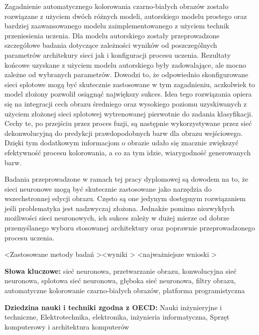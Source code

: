   Zagadnienie automatycznego kolorowania czarno-białych
  obrazów zostało rozwiązane z użyciem dwóch różnych modeli, autorskiego modelu
  prostego oraz bardziej zaawansowanego modelu zaimplementowanego z użyciem technik
  przeniesienia uczenia. Dla modelu autorskiego zostały przeprowadzone szczegółowe
  badania dotyczące zależności wyników od poszczególnych parametrów architekury
  sieci jak i konfiguracji procesu uczenia. Rezultaty końcowe uzyskane z użyciem
  modelu autorskiego były zadowalające, ale mocno zależne od wybranych parametrów.
  Dowodzi to, że odpowiednio skonfigurowane sieci splotowe mogą być skutecznie
  zastosowane w tym zagadnieniu, aczkolwiek to model złożony pozwolił osiągnąć
  największy sukces.
  Idea tego rozwiązania opiera się na integracji cech obrazu średniego oraz wysokiego
  poziomu uzyskiwanych z użyciem złożonej sieci splotowej wytrenowanej pierwotnie do
  zadania klasyfikacji. Cechy te, po przejściu przez proces fuzji, są następnie
  wykorzystywane przez sieć dekonwolucyjną do predykcji prawdopodobnych barw dla
  obrazu wejściowego. Dzięki tym dodatkowym informacjom o obrazie udało się
  znacznie zwiększyć efektywność procesu kolorowania, a co za tym idzie,
  wiarygodność generowanych barw.

  Badania przeprowadzone w ramach tej pracy dyplomowej są dowodem na to, że
  sieci neuronowe mogą być skutecznie zastosowane jako narzędzia do wszechstronnej
  edycji obrazu. Często są one jedynym dostępnym rozwiązaniem jeśli problematyka
  jest nadzwyczaj złożona. Jednakże pomimo niezwykłych możliwości sieci
  neuronowych, ich sukces zależy w dużej mierze od dobrze przemyślanego
  wyboru stosowanej architektury oraz poprawnie przeprowadzonego
  procesu uczenia.

  \textless Zastosowane metody badań \textgreater \textless wyniki \textgreater
  \textless najważniejsze wnioski \textgreater

  \bigskip

  \noindent\textbf{Słowa kluczowe:} sieć neuronowa, przetwarzanie obrazu,
  konwolucyjna sieć neuronowa, splotowa sieć neuronowa,
  głęboka sieć neuronowa, filtry obrazu, automatyczne kolorowanie czarno-białych
  obrazów, platforma programistyczna

  \bigskip

  \noindent\textbf{Dziedzina nauki i techniki zgodna z OECD:} Nauki
  inżynieryjne i techniczne, Elektrotechnika, elektronika, inżynieria
  informatyczna, Sprzęt komputerowy i architektura komputerów
